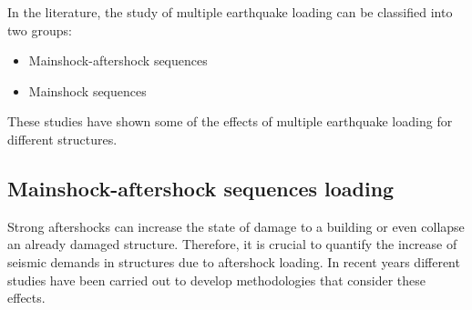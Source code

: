 In the literature, the study of multiple earthquake loading can be classified into two groups:

\begin{itemize}
	\item Mainshock-aftershock sequences
	\item Mainshock sequences
\end{itemize}

These studies have shown some of the effects of multiple earthquake loading for different structures.

\subsection{Mainshock-aftershock sequences loading }

Strong aftershocks can increase the state of damage to a building or even collapse an already damaged structure. Therefore, it is crucial to quantify the increase of seismic demands in structures due to aftershock loading. In recent years different studies have been carried out to develop methodologies that consider these effects.

